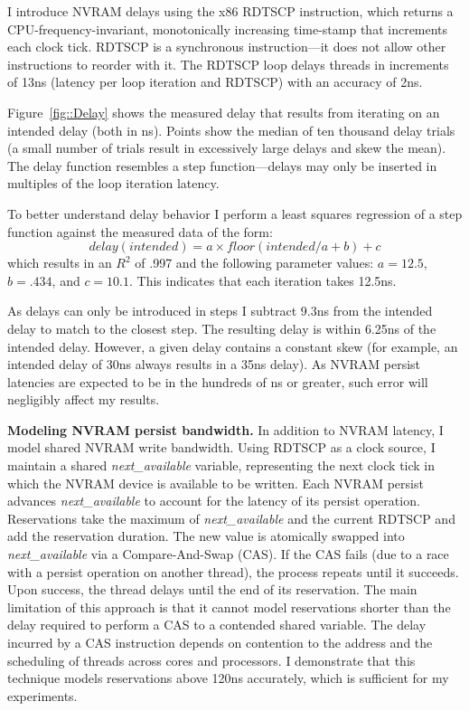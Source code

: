 I introduce NVRAM delays using the x86 RDTSCP instruction, which returns a CPU-frequency-invariant, monotonically increasing time-stamp that increments each clock tick.
RDTSCP is a synchronous instruction---it does not allow other instructions to reorder with it.
The RDTSCP loop delays threads in increments of 13ns (latency per loop iteration and RDTSCP) with an accuracy of 2ns.


Figure~\ref{fig::Delay} shows the measured delay that results from iterating on an intended delay (both in ns).
Points show the median of ten thousand delay trials (a small number of trials result in excessively large delays and skew the mean).
The delay function resembles a step function---delays may only be inserted in multiples of the loop iteration latency.

To better understand delay behavior I perform a least squares regression of a step function against the measured data of the form:
$$delay(intended) = a \times floor(intended / a + b) + c$$
which results in an $R^2$ of .997 and the following parameter values: $a = 12.5$, $b=.434$, and $c=10.1$.
This indicates that each iteration takes 12.5ns.

As delays can only be introduced in steps I subtract 9.3ns from the intended delay to match to the closest step.
The resulting delay is within 6.25ns of the intended delay.
However, a given delay contains a constant skew (for example, an intended delay of 30ns always results in a 35ns delay).
As NVRAM persist latencies are expected to be in the hundreds of ns or greater, such error will negligibly affect my results.

\textbf{Modeling NVRAM persist bandwidth.}
In addition to NVRAM latency, I model shared NVRAM write bandwidth.
Using RDTSCP as a clock source, I maintain a shared \emph{next\_available} variable, representing the next clock tick in which the NVRAM device is available to be written.
Each NVRAM persist advances \emph{next\_available} to account for the latency of its persist operation.
Reservations take the maximum of \emph{next\_available} and the current RDTSCP and add the reservation duration.
The new value is atomically swapped into \emph{next\_available} via a Compare-And-Swap (CAS).
If the CAS fails (due to a race with a persist operation on another thread), the process repeats until it succeeds.
Upon success, the thread delays until the end of its reservation.
The main limitation of this approach is that it cannot model reservations shorter than the delay required to perform a CAS to a contended shared variable.
The delay incurred by a CAS instruction depends on contention to the address and the scheduling of threads across cores and processors.
I demonstrate that this technique models reservations above 120ns accurately, which is sufficient for my experiments.


